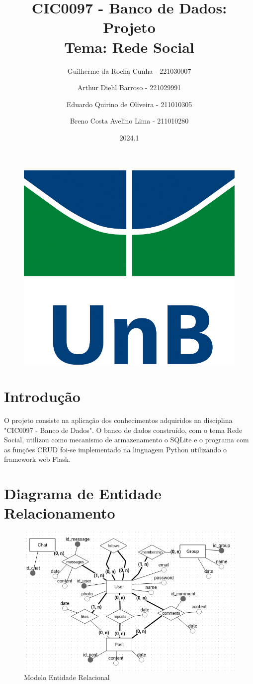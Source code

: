 \documentclass{article}
\title{CIC0097 - Banco de Dados: Projeto \\
        \large \textbf{Tema:} Rede Social}
\author{Guilherme da Rocha Cunha - 221030007 \\
        \and
        Arthur Diehl Barroso - 221029991 \\
        \and
        Eduardo Quirino de Oliveira - 211010305 \\
        \and 
        Breno Costa Avelino Lima - 211010280}
\date{2024.1}
\begin{document}
\pagestyle{fancy}

\maketitle

\begin{figure}[ht]
        \centering
        \includegraphics[width=.5\textwidth]{imagens/logo_unb.jpg}
\end{figure}

\newpage

\fancyhead{}
\fancyfoot[C]{\thepage}


\renewcommand*\contentsname{Sumário}
\tableofcontents

\newpage

\section{Introdução}
O projeto consiste na aplicação dos conhecimentos adquiridos na disciplina "CIC0097 - Banco de Dados". O banco de dados construído, com o tema Rede Social, utilizou como mecanismo de armazenamento o SQLite e o programa com as funções CRUD foi-se implementado na linguagem Python utilizando o framework web Flask.

\section{Diagrama de Entidade Relacionamento}

\begin{figure}[!ht]
        \centering
        \includegraphics[width=1\textwidth]{imagens/mer.png}
        \caption{Modelo Entidade Relacional}
\end{figure}
\end{document}
